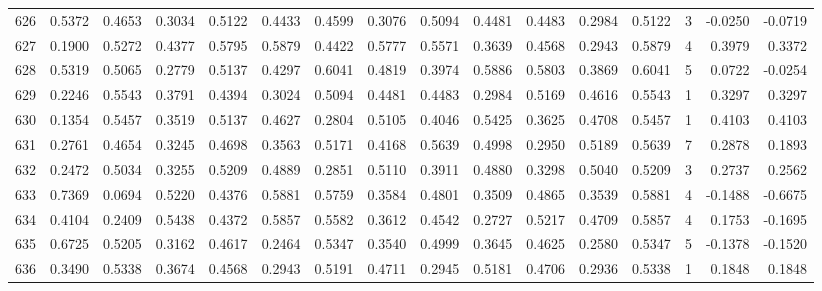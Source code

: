 \begin{tabular}{lrrrrrrrrrrrrrrr}
626 &      0.5372 &  0.4653 &  0.3034 &  0.5122 &  0.4433 &  0.4599 &  0.3076 &  0.5094 &  0.4481 &  0.4483 &   0.2984 &     0.5122 &      3 &                   -0.0250 &                    -0.0719 \\
627 &      0.1900 &  0.5272 &  0.4377 &  0.5795 &  0.5879 &  0.4422 &  0.5777 &  0.5571 &  0.3639 &  0.4568 &   0.2943 &     0.5879 &      4 &                    0.3979 &                     0.3372 \\
628 &      0.5319 &  0.5065 &  0.2779 &  0.5137 &  0.4297 &  0.6041 &  0.4819 &  0.3974 &  0.5886 &  0.5803 &   0.3869 &     0.6041 &      5 &                    0.0722 &                    -0.0254 \\
629 &      0.2246 &  0.5543 &  0.3791 &  0.4394 &  0.3024 &  0.5094 &  0.4481 &  0.4483 &  0.2984 &  0.5169 &   0.4616 &     0.5543 &      1 &                    0.3297 &                     0.3297 \\
630 &      0.1354 &  0.5457 &  0.3519 &  0.5137 &  0.4627 &  0.2804 &  0.5105 &  0.4046 &  0.5425 &  0.3625 &   0.4708 &     0.5457 &      1 &                    0.4103 &                     0.4103 \\
631 &      0.2761 &  0.4654 &  0.3245 &  0.4698 &  0.3563 &  0.5171 &  0.4168 &  0.5639 &  0.4998 &  0.2950 &   0.5189 &     0.5639 &      7 &                    0.2878 &                     0.1893 \\
632 &      0.2472 &  0.5034 &  0.3255 &  0.5209 &  0.4889 &  0.2851 &  0.5110 &  0.3911 &  0.4880 &  0.3298 &   0.5040 &     0.5209 &      3 &                    0.2737 &                     0.2562 \\
633 &      0.7369 &  0.0694 &  0.5220 &  0.4376 &  0.5881 &  0.5759 &  0.3584 &  0.4801 &  0.3509 &  0.4865 &   0.3539 &     0.5881 &      4 &                   -0.1488 &                    -0.6675 \\
634 &      0.4104 &  0.2409 &  0.5438 &  0.4372 &  0.5857 &  0.5582 &  0.3612 &  0.4542 &  0.2727 &  0.5217 &   0.4709 &     0.5857 &      4 &                    0.1753 &                    -0.1695 \\
635 &      0.6725 &  0.5205 &  0.3162 &  0.4617 &  0.2464 &  0.5347 &  0.3540 &  0.4999 &  0.3645 &  0.4625 &   0.2580 &     0.5347 &      5 &                   -0.1378 &                    -0.1520 \\
636 &      0.3490 &  0.5338 &  0.3674 &  0.4568 &  0.2943 &  0.5191 &  0.4711 &  0.2945 &  0.5181 &  0.4706 &   0.2936 &     0.5338 &      1 &                    0.1848 &                     0.1848 \\

\end{tabular}
